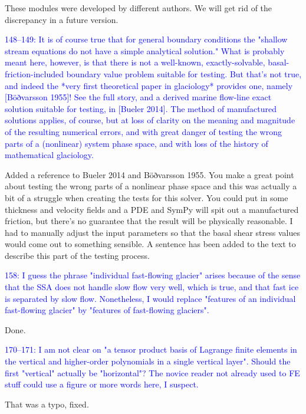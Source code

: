 \documentclass{article}
\theoremstyle{definition}
\theoremstyle{plain}
\begin{document}
These modules were developed by different authors.
We will get rid of the discrepancy in a future version.

\textcolor{blue}{148--149:  It is of course true that for general boundary conditions the "shallow stream equations do not have a simple analytical solution."  What is probably meant here, however, is that there is not a well-known, exactly-solvable, basal-friction-included boundary value problem suitable for testing.  But that's not true, and indeed the *very first theoretical paper in glaciology* provides one, namely [Böðvarsson 1955]!  See the full story, and a derived marine flow-line exact solution suitable for testing, in [Bueler 2014].  The method of manufactured solutions applies, of course, but at loss of clarity on the meaning and magnitude of the resulting numerical errors, and with great danger of testing the wrong parts of a (nonlinear) system phase space, and with loss of the history of mathematical glaciology.}

Added a reference to Bueler 2014 and Böðvarsson 1955.
You make a great point about testing the wrong parts of a nonlinear phase space and this was actually a bit of a struggle when creating the tests for this solver.
You could put in some thickness and velocity fields and a PDE and SymPy will spit out a manufactured friction, but there's no guarantee that the result will be physically reasonable.
I had to manually adjust the input parameters so that the basal shear stress values would come out to something sensible.
A sentence has been added to the text to describe this part of the testing process.

\textcolor{blue}{158:  I guess the phrase "individual fast-flowing glacier" arises because of the sense that the SSA does not handle slow flow very well, which is true, and that fast ice is separated by slow flow.  Nonetheless, I would replace "features of an individual fast-flowing glacier" by "features of fast-flowing glaciers".}

Done.

\textcolor{blue}{170--171:  I am not clear on "a tensor product basis of Lagrange finite elements in the vertical and higher-order polynomials in a single vertical layer".  Should the first "vertical" actually be "horizontal"?  The novice reader not already used to FE stuff could use a figure or more words here, I suspect.}

That was a typo, fixed.
\end{document}
